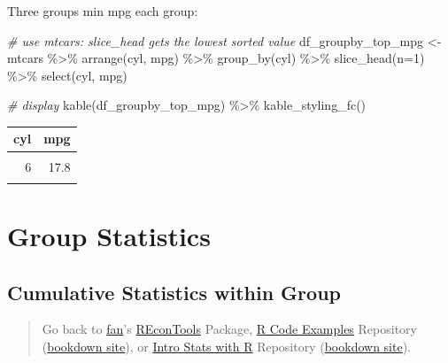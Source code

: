 \documentclass[
]{book}
\newenvironment{Shaded}{\begin{snugshade}}{\end{snugshade}}
\newcommand{\AttributeTok}[1]{\textcolor[rgb]{0.77,0.63,0.00}{#1}}
\newcommand{\CommentTok}[1]{\textcolor[rgb]{0.56,0.35,0.01}{\textit{#1}}}
\newcommand{\DecValTok}[1]{\textcolor[rgb]{0.00,0.00,0.81}{#1}}
\newcommand{\FunctionTok}[1]{\textcolor[rgb]{0.00,0.00,0.00}{#1}}
\newcommand{\NormalTok}[1]{#1}
\newcommand{\OtherTok}[1]{\textcolor[rgb]{0.56,0.35,0.01}{#1}}
\newcommand{\SpecialCharTok}[1]{\textcolor[rgb]{0.00,0.00,0.00}{#1}}
\begin{document}
Three groups min mpg each group:

\begin{Shaded}
\begin{Highlighting}[]
\CommentTok{\# use mtcars: slice\_head gets the lowest sorted value}
\NormalTok{df\_groupby\_top\_mpg }\OtherTok{\textless{}{-}}\NormalTok{ mtcars }\SpecialCharTok{\%\textgreater{}\%}
  \FunctionTok{arrange}\NormalTok{(cyl, mpg) }\SpecialCharTok{\%\textgreater{}\%}
  \FunctionTok{group\_by}\NormalTok{(cyl) }\SpecialCharTok{\%\textgreater{}\%}
  \FunctionTok{slice\_head}\NormalTok{(}\AttributeTok{n=}\DecValTok{1}\NormalTok{) }\SpecialCharTok{\%\textgreater{}\%}
  \FunctionTok{select}\NormalTok{(cyl, mpg)}

\CommentTok{\# display}
\FunctionTok{kable}\NormalTok{(df\_groupby\_top\_mpg) }\SpecialCharTok{\%\textgreater{}\%} \FunctionTok{kable\_styling\_fc}\NormalTok{()}
\end{Highlighting}
\end{Shaded}

\begin{table}[!h]
\centering
\begin{tabular}{r|r}
\hline
cyl & mpg\\
\hline
\cellcolor{gray!6}{4} & \cellcolor{gray!6}{21.4}\\
\hline
6 & 17.8\\
\hline
\cellcolor{gray!6}{8} & \cellcolor{gray!6}{10.4}\\
\hline
\end{tabular}
\end{table}

\hypertarget{group-statistics}{%
\section{Group Statistics}\label{group-statistics}}

\hypertarget{cumulative-statistics-within-group}{%
\subsection{Cumulative Statistics within Group}\label{cumulative-statistics-within-group}}

\begin{quote}
Go back to \href{http://fanwangecon.github.io/}{fan}'s \href{https://fanwangecon.github.io/REconTools/}{REconTools} Package, \href{https://fanwangecon.github.io/R4Econ/}{R Code Examples} Repository (\href{https://fanwangecon.github.io/R4Econ/bookdown}{bookdown site}), or \href{https://fanwangecon.github.io/Stat4Econ/}{Intro Stats with R} Repository (\href{https://fanwangecon.github.io/Stat4Econ/bookdown}{bookdown site}).
\end{quote}
\end{document}
